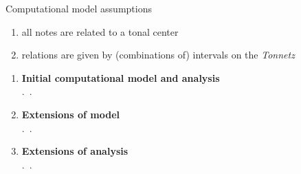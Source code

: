 \begin{frame}{\insertsectionhead}
\end{frame}


\begin{frame}{\insertsectionhead}
  Computational model assumptions
  \begin{enumerate}
    \item all notes are related to a \alert{tonal center}
    \item relations are given by (combinations of) \alert{intervals} on the \emph{Tonnetz}
  \end{enumerate}
\end{frame}

\begin{frame}{\insertsectionhead}
  \begin{enumerate}
    \item \textbf{Initial computational model and analysis}\\\citet{Moss2019a}.~.
    \item \textbf{Extensions of model}\\\citet{Lieck2020}.~.
    \item \textbf{Extensions of analysis}\\\citet{Moss2020b}.~.
  \end{enumerate}
\end{frame}


